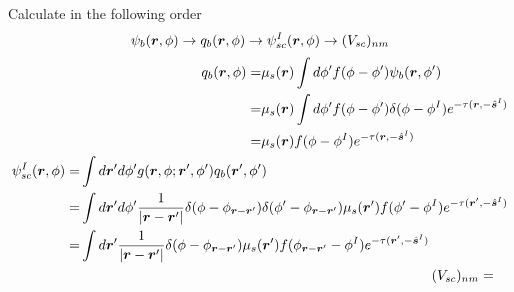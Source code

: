\documentclass [10pt,letterpaper]{article}
\newcommand{\unitvectorsym}[1]{\hat{\vectorsym{#1}}}
\begin{document}
Calculate in the following order
\begin{equation} \label{eq:order-in-which-Vscnm-1pt-is-calculated}
	\psi_b(\vectorsym{r},\phi)
	\to
	q_b(\vectorsym{r},\phi)
	\to
	\psi_{sc}^I(\vectorsym{r},\phi)
	\to
	(V_{sc})_{n m}
\end{equation}
\begin{subequations} \label{eq:result-qb-psiscI-2d-der-Vscnm-1pt}
	\begin{align}
		\begin{split}
			q_b(\vectorsym{r},\phi)
			=&
			\mu_s(\vectorsym{r})
			\int d\phi^\prime
			f(\phi-\phi^\prime)
			\psi_b(\vectorsym{r},\phi^\prime) 
			\\
			=&
			\mu_s(\vectorsym{r})
			\int d\phi^\prime
			f(\phi-\phi^\prime)
			\delta(\phi-\phi^I)
			e^{-\tau(\vectorsym{r},-\unitvectorsym{s}^I)} 
			\\
			=&
			\mu_s(\vectorsym{r})
			f(\phi-\phi^I)
			e^{-\tau(\vectorsym{r},-\unitvectorsym{s}^I)} 
		\end{split}
		\label{eq:result-qb-2d}
		\\
		\begin{split}
			\psi_{sc}^I(\vectorsym{r},\phi)
			=&
			\int d\vectorsym{r}^\prime d\phi^\prime
			g(\vectorsym{r},\phi;\vectorsym{r}^\prime,\phi^\prime)
			q_b(\vectorsym{r}^\prime,\phi^\prime)
			\\
			=&
			\int d\vectorsym{r}^\prime d\phi^\prime
			\frac
			{1}
			{\lvert \vectorsym{r}-\vectorsym{r}^\prime \rvert}
			\delta(\phi-\phi_{\vectorsym{r}-\vectorsym{r}^\prime})
			\delta(\phi^\prime-\phi_{\vectorsym{r}-\vectorsym{r}^\prime})
			\mu_s(\vectorsym{r}^\prime)
			f(\phi^\prime-\phi^I)
			e^{-\tau(\vectorsym{r}^\prime,-\unitvectorsym{s}^I)} 
			\\
			=& 
			\int d\vectorsym{r}^\prime
			\frac
			{1}
			{\lvert \vectorsym{r}-\vectorsym{r}^\prime \rvert}
			\delta(\phi-\phi_{\vectorsym{r}-\vectorsym{r}^\prime})
			\mu_s(\vectorsym{r}^\prime)
			f(\phi_{\vectorsym{r}-\vectorsym{r}^\prime}-\phi^I)
			e^{-\tau(\vectorsym{r}^\prime,-\unitvectorsym{s}^I)} 
		\end{split}
		\label{eq:result-psiscI-2d}
		\\
		\begin{split}
			(V_{sc})_{n m}
			=&

\end{split}
\end{align}
\end{subequations}
\end{document}
